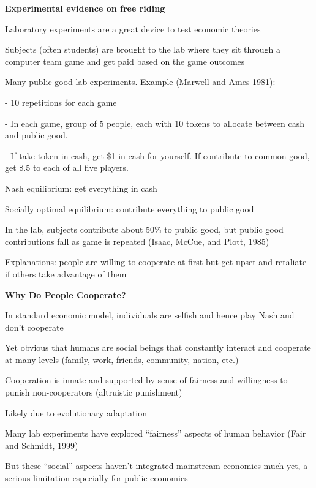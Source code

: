 \documentclass[landscape]{slides}
\begin{document}
\begin{slide}
\begin{center}
{\bf Experimental evidence on free riding}
\end{center}
\small
Laboratory experiments are a great device to test economic theories

Subjects (often students) are brought to the lab where
they sit through a computer team game and get paid based on the game outcomes

Many public good lab experiments. Example (Marwell and Ames 1981):

- 10 repetitions for each game

- In each game, group of 5 people, each with 10 tokens to allocate
between cash and public good.

- If take token in cash, get \$1 in cash for yourself. If contribute to common
good, get \$.5 to each of all five players.

Nash equilibrium: get everything in cash

Socially optimal equilibrium: contribute everything to public good

In the lab, subjects contribute about 50\% to public good, but public good contributions
fall as game is repeated (Isaac, McCue, and Plott, 1985)

Explanations: people are willing to cooperate at first but get upset and retaliate if others take
advantage of them
\end{slide}


\begin{slide}
\begin{center}
{\bf Why Do People Cooperate?}
\end{center}
In standard economic model, individuals are selfish and hence play Nash
and don't cooperate

Yet obvious that humans are social beings that constantly interact and cooperate
at many levels (family, work, friends, community, nation, etc.)

Cooperation is innate and supported by sense of fairness and willingness to punish
non-cooperators (altruistic punishment)  

Likely due to evolutionary adaptation 

Many lab experiments have explored ``fairness'' aspects of human behavior (Fair and Schmidt, 1999)

But these ``social'' aspects haven't integrated mainstream economics much yet, a serious limitation
especially for public economics

\end{slide}
\end{document}

